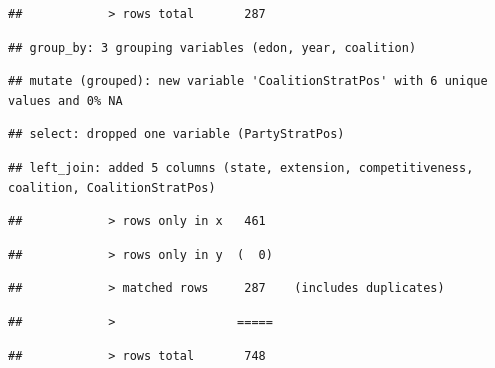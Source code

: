\documentclass[
]{article}
\newenvironment{Shaded}{\begin{snugshade}}{\end{snugshade}}
\newcommand{\DataTypeTok}[1]{\textcolor[rgb]{0.13,0.29,0.53}{#1}}
\newcommand{\KeywordTok}[1]{\textcolor[rgb]{0.13,0.29,0.53}{\textbf{#1}}}
\newcommand{\NormalTok}[1]{#1}
\newcommand{\OperatorTok}[1]{\textcolor[rgb]{0.81,0.36,0.00}{\textbf{#1}}}
\newcommand{\StringTok}[1]{\textcolor[rgb]{0.31,0.60,0.02}{#1}}
\begin{document}
\begin{verbatim}
##            > rows total       287
\end{verbatim}

\begin{verbatim}
## group_by: 3 grouping variables (edon, year, coalition)
\end{verbatim}

\begin{verbatim}
## mutate (grouped): new variable 'CoalitionStratPos' with 6 unique values and 0% NA
\end{verbatim}

\begin{verbatim}
## select: dropped one variable (PartyStratPos)
\end{verbatim}

\begin{Shaded}
\end{Shaded}

\begin{verbatim}
## left_join: added 5 columns (state, extension, competitiveness, coalition, CoalitionStratPos)
\end{verbatim}

\begin{verbatim}
##            > rows only in x   461
\end{verbatim}

\begin{verbatim}
##            > rows only in y  (  0)
\end{verbatim}

\begin{verbatim}
##            > matched rows     287    (includes duplicates)
\end{verbatim}

\begin{verbatim}
##            >                 =====
\end{verbatim}

\begin{verbatim}
##            > rows total       748
\end{verbatim}

\begin{Shaded}
\end{Shaded}
\end{document}
